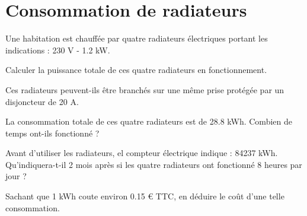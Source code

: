 \section{Consommation de radiateurs}

Une habitation est chauffée par quatre radiateurs électriques portant les indications : 230 V - \num{1.2} kW.

\begin{questions}
	\question Calculer la puissance totale de ces quatre radiateurs en fonctionnement.
	
	\fillwithdottedlines{3cm}
	
	\question Ces radiateurs peuvent-ils être branchés sur une même prise protégée par un disjoncteur de 20 A.
	
	\fillwithdottedlines{3cm}
	
	\question La consommation totale de ces quatre radiateurs est de \num{28.8} kWh. Combien de temps ont-ils fonctionné ?
	\fillwithdottedlines{3cm}
	
	\question Avant d'utiliser les radiateurs, el compteur électrique indique : \num{84237} kWh. Qu'indiquera-t-il 2 mois après si les quatre radiateurs ont fonctionné 8 heures par jour ?
	\fillwithdottedlines{5cm}
	
	\question Sachant que 1 kWh coute environ \num{0.15} € TTC, en déduire le coût d'une telle consommation.
	\fillwithdottedlines{3cm}
\end{questions}
